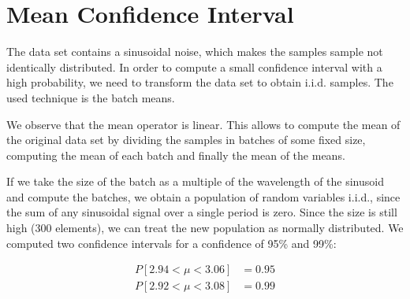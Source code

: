 \section{Mean Confidence Interval}
\label{sec:confidence}

The data set contains a sinusoidal noise, which makes the samples sample not identically distributed.
In order to compute a small confidence interval with a high probability, we need to transform the data set to obtain \ac{i.i.d.} samples.
The used technique is the batch means.

We observe that the mean operator is linear. This allows to compute the mean of the original data set by dividing the samples in batches of some fixed size, computing the mean of each batch and finally the mean of the means.

If we take the size of the batch as a multiple of the wavelength of the sinusoid and compute the batches, we obtain a population of random variables \ac{i.i.d.}, since the sum of any sinusoidal signal over a single period is zero.
Since the size is still high (\num{300} elements), we can treat the new population as normally distributed.
We computed two confidence intervals for a confidence of \num{95}\% and \num{99}\%:

\begin{equation}
    \begin{split}
        P[2.94 < \mu < 3.06] &= 0.95 \\
        P[2.92 < \mu < 3.08] &= 0.99    
    \end{split}
    \label{eq:confidence}
\end{equation}
